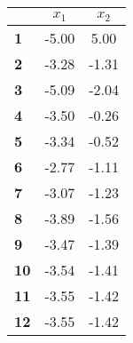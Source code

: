 \begin{small}\begin{tabular}{|l|c|c|}
\hline
&\textbf{$x_1$}&\textbf{$x_2$}\\\hline
\textbf{1}&-5.00&5.00\\\hline
\textbf{2}&-3.28&-1.31\\\hline
\textbf{3}&-5.09&-2.04\\\hline
\textbf{4}&-3.50&-0.26\\\hline
\textbf{5}&-3.34&-0.52\\\hline
\textbf{6}&-2.77&-1.11\\\hline
\textbf{7}&-3.07&-1.23\\\hline
\textbf{8}&-3.89&-1.56\\\hline
\textbf{9}&-3.47&-1.39\\\hline
\textbf{10}&-3.54&-1.41\\\hline
\textbf{11}&-3.55&-1.42\\\hline
\textbf{12}&-3.55&-1.42\\\hline
\end{tabular}
\end{small}
